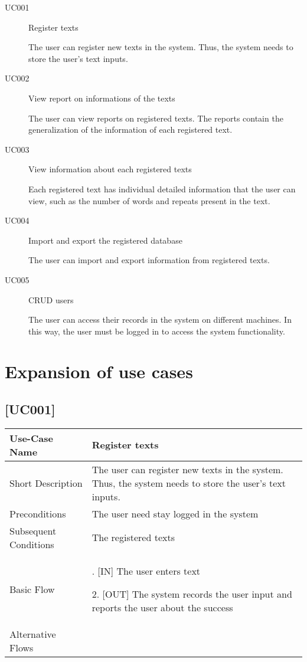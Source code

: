 \documentclass[11pt, twoside, a4paper]{book}
\begin{document}
			\begin{description}
				\item[UC001] Register texts
					
					The user can register new texts in the system. Thus, the system needs to store the user's text inputs.
					
				\item[UC002] View report on informations of the texts
				
					The user can view reports on registered texts. The reports contain the generalization of the information of each registered text.


				\item[UC003] View information about each registered texts
					
					Each registered text has individual detailed information that the user can view, such as the number of words and repeats present in the text.
										
				\item[UC004] Import and export the registered database
					
					The user can import and export information from registered texts.
					
				\item[UC005] CRUD users
					
					The user can access their records in the system on different machines. In this way, the user must be logged in to access the system functionality.
					
			\end{description}

		\section{Expansion of use cases}
			
			\subsection{[UC001]}
				\begin{tabular}{|>{\centering\arraybackslash}m{3cm} |>{\arraybackslash}m{9cm}|}												   \hline
					Use-Case Name 			& Register texts																							\\ \hline
					Short Description  		& The user can register new texts in the system. Thus, the system needs to store the user's text inputs.    \\ \hline	
					Preconditions  			& The user need stay logged in the system      																\\ \hline
					Subsequent Conditions	& The registered texts     																					\\ \hline
					Basic Flow  			& 	1. [IN] The user enters text
										
												2. [OUT] The system records the user input and reports the user about the success								\\ \hline
					Alternative Flows  		&       																									\\ \hline
				\end{tabular}
				
\end{document}
